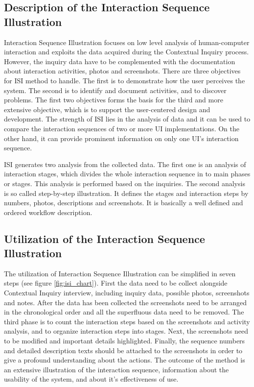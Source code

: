 \documentclass[12pt,a4paper,oneside,pdftex]{report}
\begin{document}
\subsection{Description of the Interaction Sequence Illustration}
Interaction Sequence Illustration focuses on low level analysis of human-computer interaction and exploits the data acquired during the Contextual Inquiry process. However, the inquiry data have to be complemented with the documentation about interaction activities, photos and screenshots. There are three objectives for ISI method to handle. The first is to demonstrate how the user perceives the system. The second is to identify and document activities, and to discover problems. The first two objectives forms the basis for the third and more extensive objective, which is to support the user-centered design and development. \cite{RefWorks:17}  The strength of ISI lies in the analysis of data and it can be used to compare the interaction sequences of two or more UI implementations. On the other hand, it can provide prominent information on only one UI's interaction sequence. 

ISI generates two analysis from the collected data. The first one is an analysis of interaction stages, which divides the whole interaction sequence in to main phases or stages. This analysis is performed based on the inquiries. The second analysis is so called step-by-step illustration. It defines the stages and interaction steps by numbers, photos, descriptions and screenshots. \cite{RefWorks:17} It is basically a well defined and ordered workflow description. 

\subsection{Utilization of the Interaction Sequence Illustration}
The utilization of Interaction Sequence Illustration can be simplified in seven steps (see figure \ref{fig:isi_chart}). First the data need to be collect alongside Contextual Inquiry interview, including inquiry data, possible photos, screenshots and notes.
After the data has been collected the screenshots need to be arranged in the chronological order and all the superfluous data need to be removed. The third phase is to count the interaction steps based on the screenshots and activity analysis, and to organize interaction steps into stages.
Next, the screenshots need to be modified and important details highlighted. Finally, the sequence numbers and  detailed description texts should be attached to the screenshots in order to give a profound understanding about the actions. The outcome of the method is an extensive illustration of the interaction sequence, information about the usability of the system, and about it's effectiveness of use. \cite{RefWorks:17}
	
\end{document}
